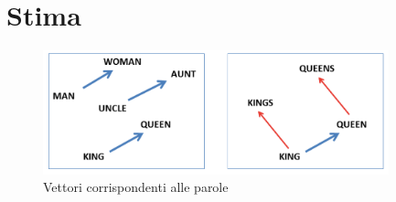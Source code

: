


\section{Stima}

\begin{figure}[htb]
	\centering
	\includegraphics[width = 100mm]{images/king-queen.png}
	\caption{Vettori corrispondenti alle parole}
	\label{2w2v}
\end{figure}